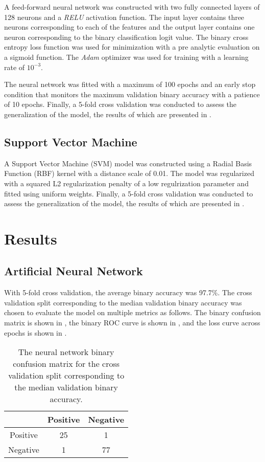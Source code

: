 \documentclass[twocolumn]{article}
\begin{document}
A feed-forward neural network was constructed with two fully connected layers of
128 neurons and a \emph{RELU} activation function. The input layer contains
three neurons corresponding to each of the features and the output layer
contains one neuron corresponding to the binary classification logit value. The
binary cross entropy loss function was used for minimization with a pre analytic
evaluation on a sigmoid function. The \emph{Adam} optimizer was used for
training with a learning rate of $10^{-3}$.

The neural network was fitted with a maximum of 100 epochs and an early stop
condition that monitors the maximum validation binary accuracy with a patience
of 10 epochs. Finally, a 5-fold cross validation was conducted to assess the
generalization of the model, the results of which are presented in
.

\subsection{Support Vector Machine}

A Support Vector Machine (SVM) model was constructed using a Radial Basis
Function (RBF) kernel with a distance scale of 0.01. The model was regularized
with a squared L2 regularization penalty of a low regulrization parameter and
fitted using uniform weights. Finally, a 5-fold cross validation was conducted
to assess the generalization of the model, the results of which are presented
in .

\section{Results}
\label{sec:Results}

\subsection{Artificial Neural Network}

With 5-fold cross validation, the average binary accuracy was 97.7\%. The
cross validation split corresponding to the median validation binary accuracy
was chosen to evaluate the model on multiple metrics as follows. The binary
confusion matrix is shown in , the binary
ROC curve is shown in , and the loss curve across
epochs is shown in .

\begin{table}
\begin{center}
\begin{tabular}{ccc}
\toprule
& Positive & Negative \\
\midrule
Positive & 25 & 1 \\
Negative & 1 & 77 \\
\bottomrule
\end{tabular}
\end{center}
\caption{The neural network binary confusion matrix for the cross validation
  split corresponding to the median validation binary accuracy.}
\label{tab:NeuralNetworkConfusionMatrix}
\end{table}
\end{document}
